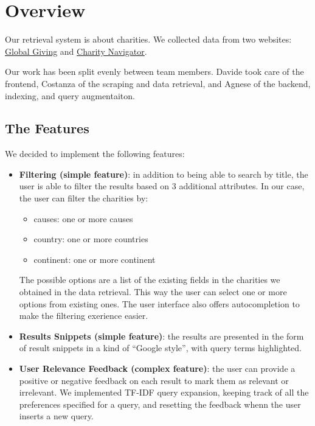 \documentclass[unicode,9pt,a4paper,oneside,numbers=endperiod,openany]{scrartcl}
\begin{document}
\setassignment
{}

\newline

\section{Overview}

Our retrieval system is about charities. We collected data from two websites: \href{https://www.globalgiving.org}{Global Giving} and \href{https://www.charitynavigator.org}{Charity Navigator}.

Our work has been split evenly between team members. Davide took care of the frontend, Costanza of the scraping and data retrieval, and Agnese of the backend, indexing, and query augmentaiton.
\subsection{The Features}

We decided to implement the following features:

\begin{itemize}
    \item \textbf{Filtering (simple feature)}: in addition to being able to search by title, the user is able to filter the results based on 3 additional attributes.
          In our case, the user can filter the charities by:
          \begin{itemize}
              \item causes: one or more causes
              \item country: one or more countries
              \item continent: one or more continent
          \end{itemize}

          The possible options are a list of the existing fields in the charities we obtained in the data retrieval. This way the user can select one or more options from existing ones.
          The user interface also offers autocompletion to make the filtering exerience easier.

    \item \textbf{Results Snippets (simple feature)}: the results are presented in the form of result snippets in a
          kind of “Google style”, with query terms highlighted.
    \item \textbf{User Relevance Feedback (complex feature)}: the user can provide a positive or negative feedback on each result to mark them as relevant or irrelevant. We implemented TF-IDF query expansion, keeping track of all the preferences specified for a query, and resetting the feedback whenn the user inserts a new query.
\end{itemize}
\end{document}
